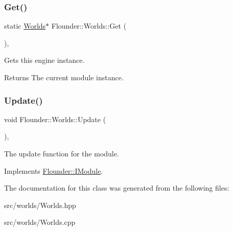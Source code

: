 \subsubsection{\texorpdfstring{Get()}{Get()}}
{\footnotesize\ttfamily static \hyperlink{class_flounder_1_1_worlds}{Worlds}$\ast$ Flounder\+::\+Worlds\+::\+Get (\begin{DoxyParamCaption}{ }\end{DoxyParamCaption})\hspace{0.3cm}{\ttfamily [inline]}, {\ttfamily [static]}}



Gets this engine instance. 

\begin{DoxyReturn}{Returns}
The current module instance. 
\end{DoxyReturn}
\mbox{\label{class_flounder_1_1_worlds_a94f6f6c9d363ba368e835307f6b3938c}} 
\subsubsection{\texorpdfstring{Update()}{Update()}}
{\footnotesize\ttfamily void Flounder\+::\+Worlds\+::\+Update (\begin{DoxyParamCaption}{ }\end{DoxyParamCaption})\hspace{0.3cm}{\ttfamily [override]}, {\ttfamily [virtual]}}



The update function for the module. 



Implements \hyperlink{class_flounder_1_1_i_module_a1812bb03a6990e4698a10c043fa25fde}{Flounder\+::\+I\+Module}.



The documentation for this class was generated from the following files\+:\begin{DoxyCompactItemize}
\item 
src/worlds/Worlds.\+hpp\item 
src/worlds/Worlds.\+cpp\end{DoxyCompactItemize}
